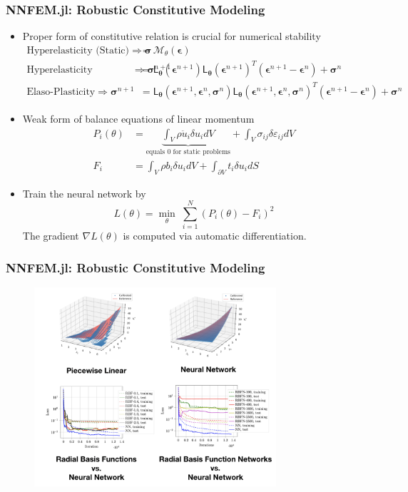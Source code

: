 \documentclass{beamer}
\newcommand{\ChoL}{\mathsf{L}}
\newcommand{\bt}[0]{\bm{\theta}}
\begin{document}
\begin{frame}
	\frametitle{NNFEM.jl: Robustic Constitutive Modeling}
	\begin{itemize}
\item Proper form of constitutive relation is crucial for numerical stability
{\footnotesize
\begin{align*}
\mbox{Hyperelasticity (Static)} \Rightarrow \bm\sigma &= \mathcal{M}_{\theta}(\bm\epsilon) \qquad\qquad\qquad\qquad \\
\mbox{Hyperelasticity (Dynamic)} \Rightarrow \bm{\sigma}^{n+1}  &=  \ChoL_{\bt}(\bm\epsilon^{n+1}) \ChoL_{\bt}(\bm\epsilon^{n+1})^T (\bm{\epsilon}^{n+1} - \bm{\epsilon}^{n})  + \bm{\sigma}^{n}  \\
	\mbox{Elaso-Plasticity}\Rightarrow \bm\sigma^{n+1} &= \ChoL_{\bt}(\bm\epsilon^{n+1},\bm{\epsilon}^{n},\bm{\sigma}^{n}) \ChoL_{\bt}(\bm\epsilon^{n+1},\bm{\epsilon}^{n},\bm{\sigma}^{n})^T (\bm{\epsilon}^{n+1} - \bm{\epsilon}^{n})  + \bm{\sigma}^{n} 
\end{align*}
}
	\item Weak form of balance equations of linear momentum 
	{\small
	\begin{align*}
		P_i(\theta) &=\underbrace{ \int_V \rho \ddot u_i \delta u_i dV}_{\mbox{equals 0 for static problems}} + \int_{V} \sigma_{ij} \delta \varepsilon_{ij}dV\\
		F_i &= \int_{V}\rho b_i \delta u_i dV + \int_{\partial V} t_i\delta u_idS
	\end{align*}
	}
	\item Train the neural network by 
	$$\boxed{L(\theta) = \min_{\theta}\;\sum_{i=1}^N(P_i(\theta) - F_i)^2}$$
	The gradient $\nabla L(\theta)$ is computed via automatic differentiation.

\end{itemize}
\end{frame}

\begin{frame}
	\frametitle{NNFEM.jl: Robustic Constitutive Modeling}
\begin{figure}[hbt]
  \includegraphics[width=0.8\textwidth]{../vs}
\end{figure}
\end{frame}
\end{document}
